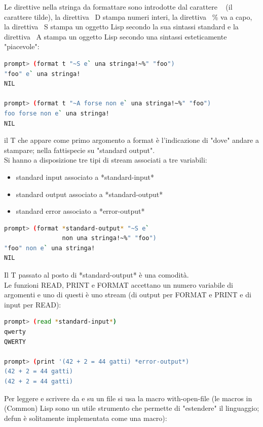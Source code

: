 \documentclass[a4paper,12pt, oneside]{book}
\begin{document}
Le direttive nella stringa da formattare sono introdotte
dal carattere ~ (il carattere tilde), la direttiva ~D stampa numeri interi, la direttiva ~\% va a capo, la direttiva ~S stampa un oggetto Lisp secondo la sua sintassi
standard e la direttiva ~A stampa un oggetto Lisp secondo una sintassi esteticamente "piacevole":
\begin{shaded}
\begin{lstlisting}[language=bash]
prompt> (format t "~S e` una stringa!~%" "foo")
"foo" e` una stringa!
NIL

prompt> (format t "~A forse non e` una stringa!~%" "foo")
foo forse non e` una stringa!
NIL
\end{lstlisting}
\end{shaded}
il T che appare come primo argomento a format è l'indicazione di "dove" andare a stampare; nella fattispecie su
"standard output".\\
Si hanno a disposizione tre tipi di stream associati a tre variabili:
\begin{itemize}
\item standard input associato a *standard-input*
\item standard output associato a *standard-output*
\item standard error associato a *error-output*
\end{itemize}
\begin{shaded}
\begin{lstlisting}[language=bash]
prompt> (format *standard-output* "~S e` 
                non una stringa!~%" "foo")
"foo" non e` una stringa!
NIL
\end{lstlisting}
\end{shaded}
Il T passato al posto di *standard-output* è una comodità.\\
Le funzioni READ, PRINT e FORMAT accettano un numero variabile di argomenti e uno di questi è uno stream (di output per FORMAT e PRINT e di input per
READ):
\begin{shaded}
\begin{lstlisting}[language=bash]
prompt> (read *standard-input*)
qwerty
QWERTY

prompt> (print '(42 + 2 = 44 gatti) *error-output*)
(42 + 2 = 44 gatti)
(42 + 2 = 44 gatti)
\end{lstlisting}
\end{shaded}
Per leggere e scrivere da e su un file si usa
la macro with-open-file (le macros in (Common) Lisp sono un utile strumento che permette di "estendere" il
linguaggio; defun è solitamente implementata come una macro):
\end{document}
